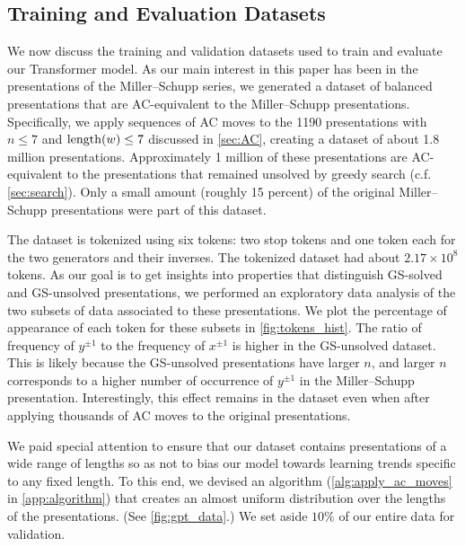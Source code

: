 \subsection{Training and Evaluation Datasets\label{sec:transformer_datasets}}

We now discuss the training and validation datasets used to train and evaluate our Transformer model.
As our main interest in this paper has been in the presentations of the Miller--Schupp series, we generated a dataset of balanced presentations that are AC-equivalent to the Miller--Schupp presentations.
Specifically, we apply sequences of AC moves to the 1190 presentations with $n \leq 7$ and $\operatorname{length}(w) \leq 7$ discussed in \autoref{sec:AC}, creating a dataset of about 1.8 million presentations.
Approximately 1 million of these presentations are AC-equivalent to the presentations that remained unsolved by greedy search (c.f. \autoref{sec:search}).
Only a small amount (roughly 15 percent) of the original Miller--Schupp presentations were part of this dataset.

The dataset is tokenized using six tokens: two stop tokens and one token each for the two generators and their inverses.
The tokenized dataset had about $2.17 \times 10^8$ tokens.
As our goal is to get insights into properties that distinguish GS-solved and GS-unsolved presentations, we performed an exploratory data analysis of the two subsets of data associated to these presentations.
We plot the percentage of appearance of each token for these subsets in \autoref{fig:tokens_hist}.
The ratio of frequency of $y^{\pm 1}$ to the frequency of $x^{\pm 1}$ is higher in the GS-unsolved dataset.
This is likely because the GS-unsolved presentations have larger $n$, and larger $n$ corresponds to a higher number of occurrence of $y^{\pm 1}$ in the Miller--Schupp presentation.
Interestingly, this effect remains in the dataset even when after applying thousands of AC moves to the original presentations.

We paid special attention to ensure that our dataset contains presentations of a wide range of lengths so as not to bias our model towards learning trends specific to any fixed length.
To this end, we devised an algorithm (\autoref{alg:apply_ac_moves} in \autoref{app:algorithm}) that creates an almost uniform distribution over the lengths of the presentations.
(See \autoref{fig:gpt_data}.) We set aside $10\%$ of our entire data for validation.

